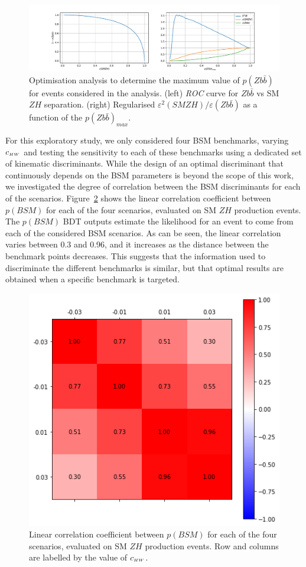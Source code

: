 \begin{figure}
\centering
\includegraphics[width=\textwidth]{plots/bkg_cut_opt.pdf}
\caption{
\label{fig:s2_over_b}
Optimisation analysis to determine the maximum value of $p(Z b\bar{b})$ for events
considered in the analysis. (left) {\it ROC} curve for $Z b\bar{b}$ vs SM $Z H$
separation. (right) Regularised $\varepsilon^2(SM Z H) /
\varepsilon(Zb\bar{b})$ as a function of the $p(Z b\bar{b})_{max}$.
}
\end{figure}

For this exploratory study, we only considered four BSM benchmarks, varying $c_{\scriptscriptstyle HW}$ and testing the
sensitivity to each of these benchmarks using a dedicated set of kinematic
discriminants. While the design of an optimal discriminant that continuously depends on
the BSM parameters is beyond the scope of this work, we investigated the degree of
correlation between the BSM discriminants for each of the scenarios.
Figure~\ref{fig:bdt_corr} shows the linear correlation coefficient between $p(BSM)$ for
each of the four scenarios, evaluated on SM $Z H$ production events. The $p(BSM)$
BDT outputs estimate the likelihood for an event to come from each of the considered BSM
scenarios.
As can be seen,
the linear correlation varies between 0.3 and 0.96, and it increases as the distance
between the benchmark points decreases. This suggests that the information used to
discriminate the different benchmarks is similar, but that optimal results are obtained
when a specific benchmark is targeted.

\begin{figure}[h!]
\includegraphics[width=0.45\linewidth]{plots/bdt_corr.png}
\caption{\label{fig:bdt_corr}
  Linear correlation coefficient between $p(BSM)$ for
  each of the four scenarios, evaluated on SM $Z H$ production events.
  Row and columns are labelled by the value of $c_{\scriptscriptstyle HW}$.
}
\end{figure}


